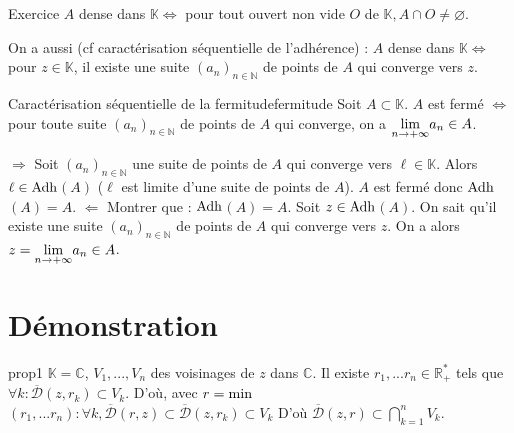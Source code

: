 \documentclass[12pt,a4paper]{report}
\begin{document}
\begin{application}{Exercice}{}
$A$ dense dans $\mathbb{K} \Longleftrightarrow$ pour tout ouvert non vide $O$ de $\mathbb{K}, A \cap O \neq \varnothing$.
\end{application}

\begin{remarque}
On a aussi (cf caractérisation séquentielle de l'adhérence) : $A$ dense dans $\mathbb{K} \Longleftrightarrow$ pour $z \in \mathbb{K}$, il existe une suite $(a_n)_{n \in \mathbb{N}}$ de points de $A$ qui converge vers $z$.
\end{remarque}

\begin{proposition}{Caractérisation séquentielle de la fermitude}{fermitude}
Soit $A \subset \mathbb{K}$. $A$ est fermé $\Longleftrightarrow$ pour toute suite $(a_n)_{n \in \mathbb{N}}$ de points de $A$ qui converge, on a $\underset{n \rightarrow +\infty}{\rm{lim}} a_n \in A$.
\end{proposition}

\begin{demo}{}
$\Longrightarrow$ Soit $(a_n)_{n \in \mathbb{N}}$ une suite de points de $A$ qui converge vers $\ell \in \mathbb{K}$. Alors $\ell \in \rm{Adh}$$(A)$ ($\ell$ est limite d'une suite de points de $A$). $A$ est fermé donc $\rm{Adh}$$(A) = A$.
\newline $\Longleftarrow$ Montrer que : $\rm{Adh}$$(A) = A$. Soit $z \in \rm{Adh}$$(A)$. On sait qu'il existe une suite $(a_n)_{n \in \mathbb{N}}$ de points de $A$ qui converge vers $z$. On a alors $z = \underset{n \rightarrow +\infty}{\rm{lim}} a_n \in A$.
\end{demo}



\pagebreak
\section*{Démonstration}

\begin{demonstration}{prop1}
$\mathbb{K}=\mathbb{C}$, $V_1, ..., V_n$ des voisinages de $z$ dans $\mathbb{C}$. Il existe $r_1,...r_n \in \mathbb{R}^*_+$ tels que
\newline $\forall k : \overline{\mathcal{D}}(z,r_k) \subset V_k$. D'où, avec $r = \rm{min}$$(r_1,...r_n) : \forall k, \overline{\mathcal{D}}(r,z) \subset \overline{\mathcal{D}}(z,r_k) \subset V_k$
\newline D'où $\overline{\mathcal{D}}(z,r) \subset \displaystyle{\bigcap_{k=1}^{n}}V_k$.
\end{demonstration}
\end{document}
